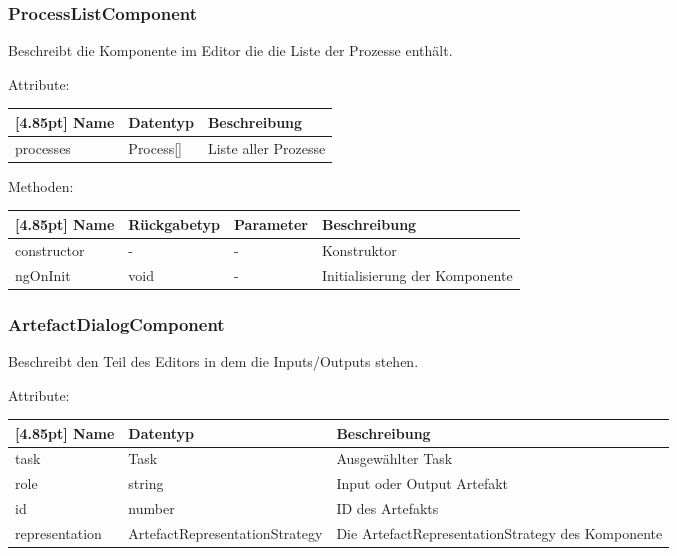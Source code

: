 			\subsubsection{ProcessListComponent}
			
			Beschreibt die Komponente im Editor die die Liste der Prozesse enthält.\newline
			
				Attribute:
				\begin{center}
					\renewcommand{\arraystretch}{1.5}
					\setlength\tabcolsep{5pt}
					\begin{tabularx}{\textwidth}{|l|l|X|}
						\hline
						\rowcolor[gray]{0.75}[4.85pt]					
						Name & Datentyp & Beschreibung \\ \hline
						processes & Process[] & Liste aller Prozesse \\ \hline
					\end{tabularx}
				\end{center}
				
				Methoden:
				\begin{center}
				\setlength\tabcolsep{5pt}
					\renewcommand{\arraystretch}{1.5}
						\begin{tabularx}{\textwidth}{|l|l|l|X|}
						\hline
						\rowcolor[gray]{0.75}[4.85pt]
						Name & Rückgabetyp & Parameter & Beschreibung \\ \hline 
						constructor & - & - & Konstruktor \\ \hline
						ngOnInit & void & - & Initialisierung der Komponente \\ \hline
						\end{tabularx}
				\end{center}
			
			\subsubsection{ArtefactDialogComponent}
			
			Beschreibt den Teil des Editors in dem die Inputs/Outputs stehen.\newline
			
				Attribute:
				\begin{center}
					\renewcommand{\arraystretch}{1.5}
					\setlength\tabcolsep{5pt}
					\begin{tabularx}{\textwidth}{|l|l|X|}
						\hline
						\rowcolor[gray]{0.75}[4.85pt]					
						Name & Datentyp & Beschreibung \\ \hline
						task & Task & Ausgewählter Task \\ \hline
						role & string & Input oder Output Artefakt \\ \hline
						id & number & ID des Artefakts \\ \hline
						representation & ArtefactRepresentationStrategy & Die ArtefactRepresentationStrategy des Komponente \\ \hline
					\end{tabularx}
				\end{center}
				
